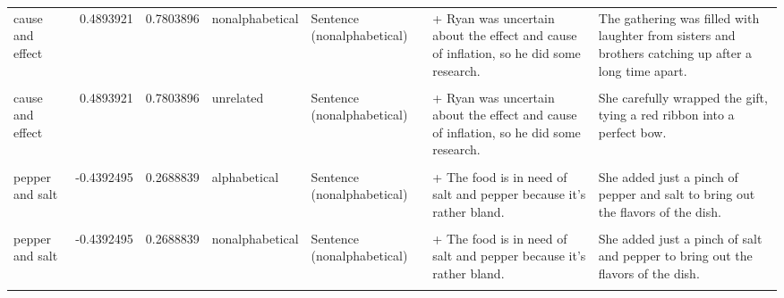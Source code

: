 \documentclass[
  12pt,
]{scrartcl}
\begin{document}
\begin{landscape}
\begin{longtable}{lrrllll}
cause and effect & 0.4893921 & 0.7803896 & nonalphabetical & Sentence (nonalphabetical) & + Ryan was uncertain about the effect and cause of inflation, so he did some research. & The gathering was filled with laughter from sisters and brothers catching up after a long time apart.\\
\cellcolor{gray!6}{cause and effect} & \cellcolor{gray!6}{0.4893921} & \cellcolor{gray!6}{0.7803896} & \cellcolor{gray!6}{unrelated} & \cellcolor{gray!6}{Sentence (alphabetical)} & \cellcolor{gray!6}{+ Ryan was uncertain about the cause and effect of inflation, so he did some research.} & \cellcolor{gray!6}{She carefully wrapped the gift, tying a red ribbon into a perfect bow.}\\
cause and effect & 0.4893921 & 0.7803896 & unrelated & Sentence (nonalphabetical) & + Ryan was uncertain about the effect and cause of inflation, so he did some research. & She carefully wrapped the gift, tying a red ribbon into a perfect bow.\\
\cellcolor{gray!6}{pepper and salt} & \cellcolor{gray!6}{-0.4392495} & \cellcolor{gray!6}{0.2688839} & \cellcolor{gray!6}{alphabetical} & \cellcolor{gray!6}{Sentence (alphabetical)} & \cellcolor{gray!6}{+ The food is in need of pepper and salt because it's rather bland.} & \cellcolor{gray!6}{She added just a pinch of pepper and salt to bring out the flavors of the dish.}\\
\addlinespace
pepper and salt & -0.4392495 & 0.2688839 & alphabetical & Sentence (nonalphabetical) & + The food is in need of salt and pepper because it's rather bland. & She added just a pinch of pepper and salt to bring out the flavors of the dish.\\
\cellcolor{gray!6}{pepper and salt} & \cellcolor{gray!6}{-0.4392495} & \cellcolor{gray!6}{0.2688839} & \cellcolor{gray!6}{nonalphabetical} & \cellcolor{gray!6}{Sentence (alphabetical)} & \cellcolor{gray!6}{+ The food is in need of pepper and salt because it's rather bland.} & \cellcolor{gray!6}{She added just a pinch of salt and pepper to bring out the flavors of the dish.}\\
pepper and salt & -0.4392495 & 0.2688839 & nonalphabetical & Sentence (nonalphabetical) & + The food is in need of salt and pepper because it's rather bland. & She added just a pinch of salt and pepper to bring out the flavors of the dish.\\
\cellcolor{gray!6}{pepper and salt} & \cellcolor{gray!6}{-0.4392495} & \cellcolor{gray!6}{0.2688839} & \cellcolor{gray!6}{unrelated} & \cellcolor{gray!6}{Sentence (alphabetical)} & \cellcolor{gray!6}{+ The food is in need of pepper and salt because it's rather bland.} & \cellcolor{gray!6}{The dog barked at the mailman every day, as if it were his sworn duty.}\\

\end{longtable}
\end{landscape}
\end{document}
